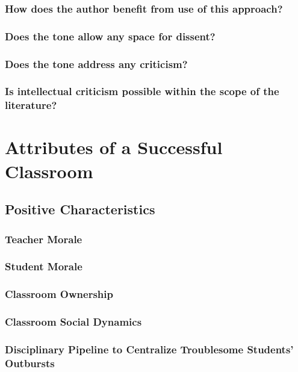 \documentclass[12pt]{article}
\begin{document}
	\subsubsection{How does the author benefit from use of this approach?}
	\subsubsection{Does the tone allow any space for dissent?}
	\subsubsection{Does the tone address any criticism?}
	\subsubsection{Is intellectual criticism possible within the scope of the literature?}
	
	\section{Attributes of a Successful Classroom}
	\subsection{Positive Characteristics}
	\subsubsection{Teacher Morale}
	\subsubsection{Student Morale}
	\subsubsection{Classroom Ownership}
	\subsubsection{Classroom Social Dynamics}
	\subsubsection{Disciplinary Pipeline to Centralize Troublesome Students' Outbursts}
\end{document}
